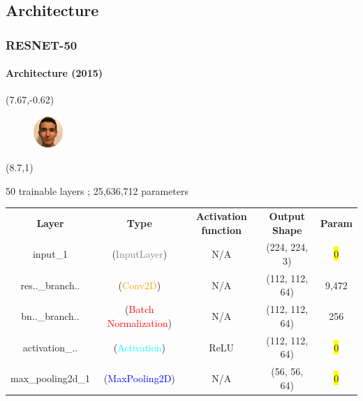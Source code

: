 \renewcommand{\arraystretch}{1.1}

\subsection{Architecture}
\begin{frame}
\frametitle{RESNET-50}
\framesubtitle{Architecture (2015)} 

\begin{textblock}{15}(7.67,-0.62)
	\begin{figure}[H]
		\includegraphics[width=0.1\textwidth]{Images/Team/MehdiABOUZAID.png} 
	\end{figure}
\end{textblock}

\begin{textblock}{1}(8.7,1)
	\centerline{50 trainable layers ; 25,636,712 parameters}
\end{textblock}

\begin{center}
	
	{\fontsize{7.5}{0}\selectfont
		\begin{tabular}{ccccc}
			
			\textbf{Layer} & \textbf{Type} & \textbf{Activation function} & \textbf{Output Shape} & \textbf{Param} \\
			input\_1  & (\textcolor{gray}{InputLayer}) & N/A & (224, 224, 3) & \colorbox{yellow}{0} \\             
			res..\_branch.. & (\textcolor{orange}{Conv2D}) & N/A & (112, 112, 64) & 9,472 \\    
			bn..\_branch.. & (\textcolor{red}{Batch Normalization}) & N/A & (112, 112, 64) & 256 \\     
			activation\_.. & (\textcolor{cyan}{Activation}) & ReLU & (112, 112, 64) & \colorbox{yellow}{0} \\
			max\_pooling2d\_1 & (\textcolor{blue}{MaxPooling2D}) & N/A & (56, 56, 64) & \colorbox{yellow}{0} \\     
			

\end{tabular}}
\end{center}
\end{frame}
